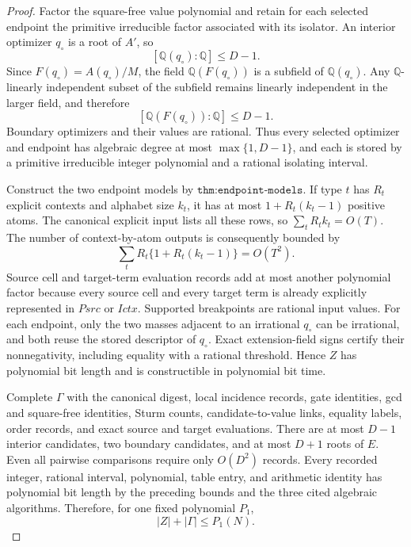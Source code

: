 \documentclass{article}
\begin{document}
\begin{proof}
Factor the square-free value polynomial and retain for each selected endpoint the primitive irreducible factor associated with its isolator.  An interior optimizer \(q_\circ\) is a root of \(A'\), so
\[
 [\mathbb Q(q_\circ):\mathbb Q]\leq D-1.
\]
Since \(F(q_\circ)=A(q_\circ)/M\), the field \(\mathbb Q(F(q_\circ))\) is a subfield of \(\mathbb Q(q_\circ)\).  Any \(\mathbb Q\)-linearly independent subset of the subfield remains linearly independent in the larger field, and therefore
\[
 [\mathbb Q(F(q_\circ)):\mathbb Q]\leq D-1.
\]
Boundary optimizers and their values are rational.  Thus every selected optimizer and endpoint has algebraic degree at most \(\max\{1,D-1\}\), and each is stored by a primitive irreducible integer polynomial and a rational isolating interval.

Construct the two endpoint models by \(\texttt{thm:endpoint-models}\).  If type \(t\) has \(R_t\) explicit contexts and alphabet size \(k_t\), it has at most \(1+R_t(k_t-1)\) positive atoms.  The canonical explicit input lists all these rows, so \(\sum_tR_tk_t=O(T)\).  The number of context-by-atom outputs is consequently bounded by
\[
 \sum_t R_t\{1+R_t(k_t-1)\}=O(T^2).
\]
Source cell and target-term evaluation records add at most another polynomial factor because every source cell and every target term is already explicitly represented in \(Psrc\) or \(Ictx\).  Supported breakpoints are rational input values.  For each endpoint, only the two masses adjacent to an irrational \(q_\circ\) can be irrational, and both reuse the stored descriptor of \(q_\circ\).  Exact extension-field signs certify their nonnegativity, including equality with a rational threshold.  Hence \(Z\) has polynomial bit length and is constructible in polynomial bit time.

Complete \(\Gamma\) with the canonical digest, local incidence records, gate identities, gcd and square-free identities, Sturm counts, candidate-to-value links, equality labels, order records, and exact source and target evaluations.  There are at most \(D-1\) interior candidates, two boundary candidates, and at most \(D+1\) roots of \(E\).  Even all pairwise comparisons require only \(O(D^2)\) records.  Every recorded integer, rational interval, polynomial, table entry, and arithmetic identity has polynomial bit length by the preceding bounds and the three cited algebraic algorithms.  Therefore, for one fixed polynomial \(P_1\),
\[
 |Z|+|\Gamma|\leq P_1(N).
\]


\end{proof}
\end{document}
